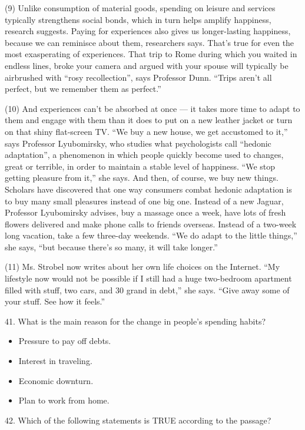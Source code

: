 \documentclass[UTF8,11pt]{ctexart}
\begin{document}
(9) Unlike consumption of material goods, spending on leisure and services typically strengthens social bonds, which in turn helps amplify happiness, research suggests. Paying for experiences also gives us longer-lasting happiness, because we can reminisce about them, researchers says. That’s true for even the most exasperating of experiences. That trip to Rome during which you waited in endless lines, broke your camera and argued with your spouse will typically be airbrushed with “rosy recollection”, says Professor Dunn. “Trips aren’t all perfect, but we remember them as perfect.”


(10) And experiences can’t be absorbed at once — it takes more time to adapt to them and engage with them than it does to put on a new leather jacket or turn on that shiny flat-screen TV. “We buy a new house, we get accustomed to it,” says Professor Lyubomirsky, who studies what psychologists call “hedonic adaptation”, a phenomenon in which people quickly become used to changes, great or terrible, in order to maintain a stable level of happiness. “We stop getting pleasure from it,” she says. And then, of course, we buy new things. Scholars have discovered that one way consumers combat hedonic adaptation is to buy many small pleasures instead of one big one. Instead of a new Jaguar, Professor Lyubomirsky advises, buy a massage once a week, have lots of fresh flowers delivered and make phone calls to friends overseas. Instead of a two-week long vacation, take a few three-day weekends. “We do adapt to the little things,” she says, “but because there’s so many, it will take longer.”


(11) Ms. Strobel now writes about her own life choices on the Internet. “My lifestyle now would not be possible if I still had a huge two-bedroom apartment filled with stuff, two cars, and 30 grand in debt,” she says. “Give away some of your stuff. See how it feels.”


41. What is the main reason for the change in people’s spending habits?


\begin{itemize}[leftmargin=2em,itemsep=.2em,topsep=.4em]\item[A.] Pressure to pay off debts.
\item[B.] Interest in traveling.
\item[C.] Economic downturn.
\item[D.] Plan to work from home.
\end{itemize}

42. Which of the following statements is TRUE according to the passage?
\end{document}
